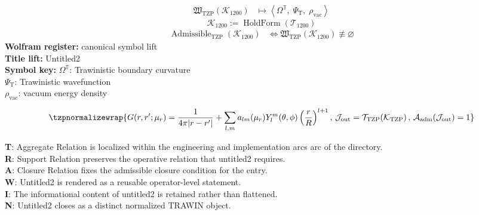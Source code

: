 \noindent
\begin{minipage}[t]{0.48\linewidth}
\begingroup
\small
\[
\begin{aligned}
\mathfrak{W}_{\mathrm{TZP}}\!\left(\mathcal{K}_{1200}\right)
&\longmapsto
\left\langle \Omega^{\mathbb{T}},\; \Psi_{\mathrm{T}},\; \rho_{\mathrm{vac}} \right\rangle
\end{aligned}
\]
\[
\mathcal{K}_{1200}
:=
\operatorname{HoldForm}\!\left(\mathcal{T}_{1200}\right)
\]
\[
\begin{aligned}
\operatorname{Admissible}_{\mathrm{TZP}}\!\left(\mathcal{K}_{1200}\right)
&\Longleftrightarrow
\mathfrak{W}_{\mathrm{TZP}}\!\left(\mathcal{K}_{1200}\right)\not\equiv\varnothing
\end{aligned}
\]
\textbf{Wolfram register:} canonical symbol lift\\
\textbf{Title lift:} Untitled2\\
\textbf{Symbol key:} \(\Omega^{\mathbb{T}}\): Trawinistic boundary curvature\\ \(\Psi_{\mathrm{T}}\): Trawinistic wavefunction\\ \(\rho_{\mathrm{vac}}\): vacuum energy density
\par
\endgroup
\end{minipage}\hfill
\begin{minipage}[t]{0.48\linewidth}
\[
\tzpnormalizewrap{G(r,r';\mu_r)=\frac{1}{4\pi\lvert r-r'\rvert}+\sum_{l,m}a_{lm}(\mu_r)Y_l^m(\theta,\phi)\left(\frac{r}{R}\right)^{l+1},\,\mathcal{J}_{\mathrm{out}}=\mathcal{T}_{\mathrm{TZP}}\!\left(\mathcal{K}_{\mathrm{TZP}}\right),\,\mathcal{A}_{\mathrm{adm}}\!\left(\mathcal{J}_{\mathrm{out}}\right)=1}
\]

\small
\textbf{T}: Aggregate Relation is localized within the engineering and implementation arcs arc of the directory.\\
\textbf{R}: Support Relation preserves the operative relation that untitled2 requires.\\
\textbf{A}: Closure Relation fixes the admissible closure condition for the entry.\\
\textbf{W}: Untitled2 is rendered as a reusable operator-level statement.\\
\textbf{I}: The informational content of untitled2 is retained rather than flattened.\\
\textbf{N}: Untitled2 closes as a distinct normalized TRAWIN object.
\normalsize
\end{minipage}

